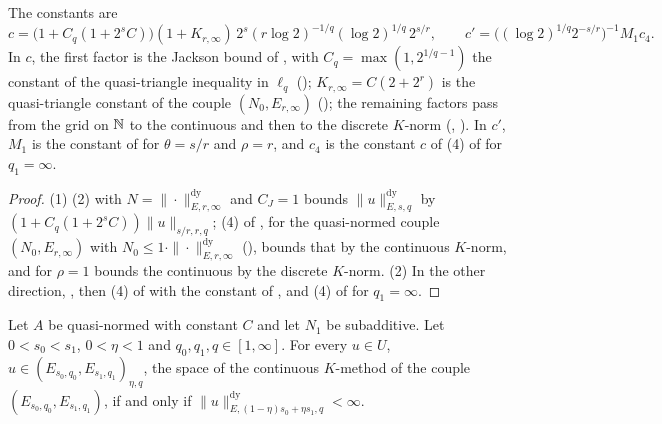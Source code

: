 The constants are
\[
  c = \bigl(1 + C_q (1 + 2^s C)\bigr) (1 + K_{r, \infty}) \, 2^s (r \log 2)^{-1/q}
  (\log 2)^{1/q} \, 2^{s/r} , \qquad
  c' = \bigl((\log 2)^{1/q} 2^{-s/r}\bigr)^{-1} M_1 c_4 .
\]
In $c$, the first factor is the Jackson bound of , with
$C_q = \max(1, 2^{1/q - 1})$ the constant of the quasi-triangle inequality in $\ell_q$
(); $K_{r, \infty} = C (2 + 2^r)$ is the quasi-triangle constant of
the couple $(N_0, E_{r, \infty})$ (); the remaining factors pass from the
grid on $\mathbb{N}$ to the continuous and then to the discrete $K$-norm
(, ). In $c'$, $M_1$ is the
constant of  for $\theta = s/r$ and $\rho = r$, and $c_4$
is the constant $c$ of (4) of  for $q_1 = \infty$.

\begin{proof}
\leanok
{}
(1)  (2) with $N = \|\cdot\|^{\mathrm{dy}}_{E, r, \infty}$ and
$C_J = 1$ bounds $\|u\|^{\mathrm{dy}}_{E, s, q}$ by $(1 + C_q (1 + 2^s C)) \|u\|_{s/r, r, q}$;
(4) of , for the quasi-normed couple $(N_0, E_{r, \infty})$ with
$N_0 \leq 1 \cdot \|\cdot\|^{\mathrm{dy}}_{E, r, \infty}$ (), bounds that by
the continuous $K$-norm, and  for $\rho = 1$ bounds the
continuous by the discrete $K$-norm. (2) In the other direction,
, then (4) of  with the
constant of , and (4) of 
for $q_1 = \infty$.
\end{proof}

\begin{theorem}
\label{thm:e-spaces-reiteration}
\leanok
{}
Let $A$ be quasi-normed with constant $C$ and let $N_1$ be subadditive. Let $0 < s_0 < s_1$,
$0 < \eta < 1$ and $q_0, q_1, q \in [1, \infty]$. For every $u \in U$,
$u \in (E_{s_0, q_0}, E_{s_1, q_1})_{\eta, q}$, the space of the continuous $K$-method of the
couple $(E_{s_0, q_0}, E_{s_1, q_1})$, if and only if
$\|u\|^{\mathrm{dy}}_{E, (1-\eta)s_0 + \eta s_1, q} < \infty$.
\end{theorem}

